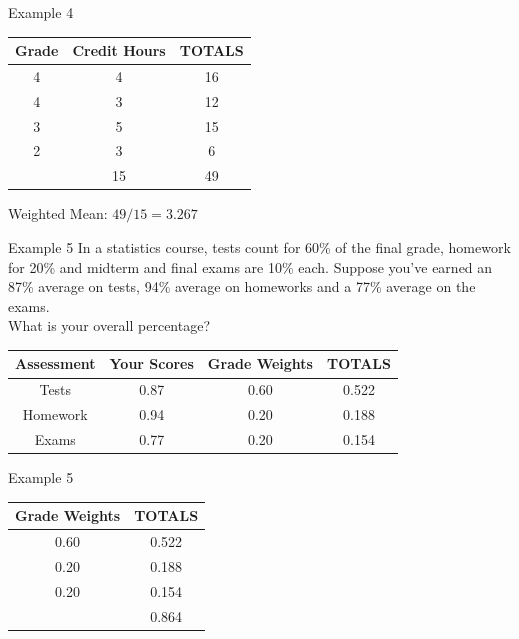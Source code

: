 \documentclass[t]{beamer}
\begin{document}
\begin{frame}{Example 4}
\begin{center}
\begin{tabular}{c|c|c}
\textbf{Grade}	&	\textbf{Credit Hours}	&	\textbf{TOTALS} 	\\	\hline
4 				&	4						&	16						\\
4 				&	3						&	12						\\
3 				&	5						&	15						\\
2 				&	3						&	6						\\	\hline
				&	15						&	49					\\
\end{tabular}
\end{center}
\vspace{10pt}	\pause

Weighted Mean: $49/15 = 3.267$
\end{frame}

\begin{frame}{Example 5}
In a statistics course, tests count for 60\% of the final grade, homework for 20\% and midterm and final exams are 10\% each. Suppose you've earned an 87\% average on tests, 94\% average on homeworks and a 77\% average on the exams. \newline\\ 
What is your overall percentage?	\newline\\	\pause
\begin{center}
\begin{tabular}{|c|c|c|c|}
\textbf{Assessment}	&	\textbf{Your Scores}	&	\textbf{Grade Weights}	&	\textbf{TOTALS}	\\	\hline
Tests 				&	0.87					&	0.60					&	0.522			\\
Homework 			&	0.94					&	0.20					&	0.188			\\
Exams 				&	0.77					&	0.20					&	0.154			\\
\end{tabular}
\end{center}
\end{frame}

\begin{frame}{Example 5}
\begin{center}
\begin{tabular}{|c|c|}
\textbf{Grade Weights}	&	\textbf{TOTALS}	\\	\hline
0.60					&	0.522			\\
0.20					&	0.188			\\
0.20					&	0.154			\\	\hline
\onslide<2->{1						&	0.864}			\\
\end{tabular}
\end{center}

\end{frame}
\end{document}
